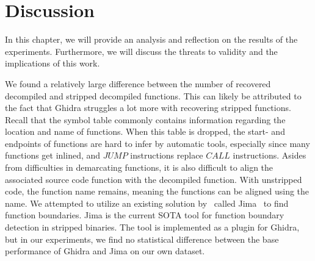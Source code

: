 \chapter{Discussion}
\label{discussion}
In this chapter, we will provide an analysis and reflection on the results of the experiments. Furthermore, we will discuss the threats to validity and the implications of this work.

We found a relatively large difference between the number of recovered decompiled and stripped decompiled functions. This can likely be attributed to the fact that Ghidra struggles a lot more with recovering stripped functions. Recall that the symbol table commonly contains information regarding the location and name of functions. When this table is dropped, the start- and endpoints of functions are hard to infer by automatic tools, especially since many functions get inlined, and \(JUMP\) instructions replace \(CALL\) instructions. Asides from difficulties in demarcating functions, it is also difficult to align the associated source code function with the decompiled function. With unstripped code, the function name remains, meaning the functions can be aligned using the name. We attempted to utilize an existing solution by~\citeauthor{FunctionBoundaryDetection} called Jima~\cite{FunctionBoundaryDetection} to find function boundaries. Jima is the current SOTA tool for function boundary detection in stripped binaries. The tool is implemented as a plugin for Ghidra, but in our experiments, we find no statistical difference between the base performance of Ghidra and Jima on our own dataset.

